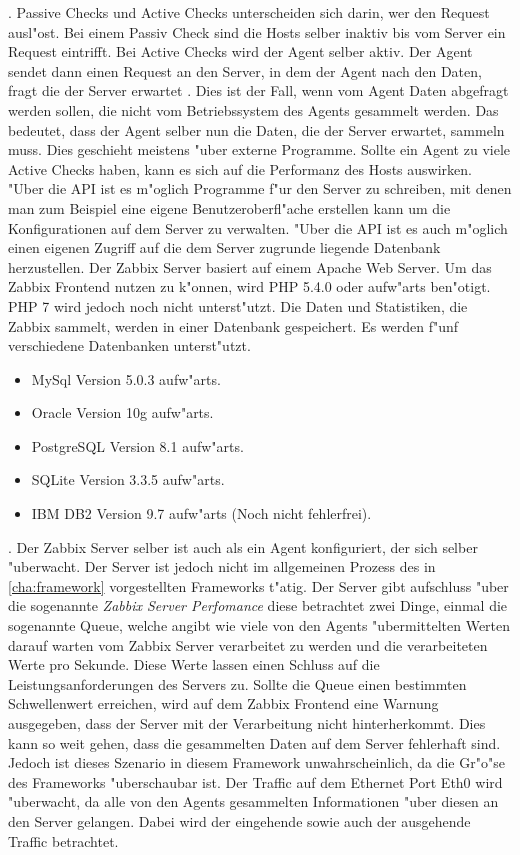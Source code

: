 \autocite{zabbix:activepassive}. Passive Checks und Active Checks unterscheiden sich darin, wer den Request %
ausl"ost. Bei einem Passiv Check sind die Hosts selber inaktiv bis vom Server ein Request eintrifft. Bei Active %
Checks wird der Agent selber aktiv. Der Agent sendet dann einen Request an den Server, in dem der Agent nach den %
Daten, fragt die der Server erwartet \autocite{zabbix:activepassive2}. %
Dies ist der Fall, wenn vom Agent Daten abgefragt werden sollen, die nicht vom %
Betriebssystem des Agents gesammelt werden. Das bedeutet, dass der Agent selber nun die Daten, die der Server erwartet, %
sammeln muss. Dies geschieht meistens "uber externe Programme. Sollte ein Agent zu viele Active Checks haben, kann es %
sich auf die Performanz des Hosts auswirken. \ \\ %

"Uber die API ist es m"oglich Programme f"ur den Server zu schreiben, mit denen man zum Beispiel %
eine eigene Benutzeroberfl"ache erstellen kann um die Konfigurationen auf dem Server zu verwalten. %
"Uber die API ist es auch m"oglich einen eigenen Zugriff auf die dem Server zugrunde liegende %
Datenbank herzustellen. %
Der Zabbix Server basiert auf einem Apache Web Server. Um das Zabbix Frontend nutzen zu k"onnen, wird %
PHP 5.4.0 oder aufw"arts ben"otigt. PHP 7 wird jedoch noch nicht unterst"utzt. Die Daten und Statistiken, die Zabbix sammelt, %
werden in einer Datenbank gespeichert. Es werden f"unf verschiedene Datenbanken unterst"utzt. %
\begin{itemize}
\item MySql Version 5.0.3 aufw"arts.
\item Oracle Version 10g aufw"arts.
\item PostgreSQL Version 8.1 aufw"arts.
\item SQLite Version 3.3.5 aufw"arts.
\item IBM DB2 Version 9.7 aufw"arts (Noch nicht fehlerfrei).
\end{itemize}
\autocite{zabbix:req}.
Der Zabbix Server selber ist auch als ein Agent konfiguriert, der sich selber "uberwacht. Der Server %
ist jedoch nicht im allgemeinen Prozess des in \cref{cha:framework} vorgestellten Frameworks t"atig. %
Der Server gibt aufschluss "uber die sogenannte \emph{Zabbix Server Perfomance} diese betrachtet zwei Dinge, einmal die sogenannte Queue, welche %
angibt wie viele von den Agents "ubermittelten Werten darauf warten vom Zabbix Server verarbeitet zu werden und %
die verarbeiteten Werte pro Sekunde. Diese Werte lassen einen Schluss auf die Leistungsanforderungen des Servers zu. %
Sollte die Queue einen bestimmten Schwellenwert erreichen, wird auf dem Zabbix Frontend eine Warnung ausgegeben, dass der %
Server mit der Verarbeitung nicht hinterherkommt. Dies kann so weit gehen, dass die gesammelten Daten auf dem Server fehlerhaft %
sind. Jedoch ist dieses Szenario in diesem Framework unwahrscheinlich, da die Gr"o"se des %
Frameworks "uberschaubar ist. Der Traffic auf dem Ethernet Port Eth0 wird "uberwacht, da alle von den Agents gesammelten Informationen %
"uber diesen an den Server gelangen. Dabei wird der eingehende sowie auch der ausgehende Traffic betrachtet.

